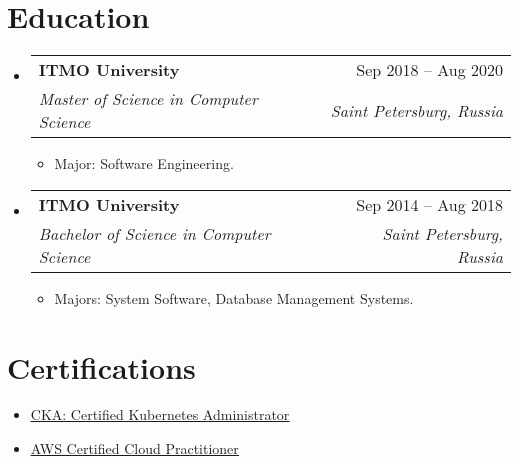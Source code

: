 \documentclass[a4paper,10pt]{article}
\makeatletter
\newcommand{\resumeItem}[1]{
  \item\small{#1}
}
\newcommand{\resumeItemListStart}{\begin{itemize}[rightmargin=0.11in]}
\newcommand{\resumeItemListEnd}{\end{itemize}}
\newcommand{\resumeTrioHeading}[3]{
  \item\small{
    \begin{tabular*}{0.96\textwidth}[t]{
      l@{\extracolsep{\fill}}c@{\extracolsep{\fill}}r
    }
      \textbf{#1} & \textit{#2} & #3
    \end{tabular*}
  }
}
\newcommand{\resumeQuadHeading}[4]{
  \item
  \begin{tabular*}{0.96\textwidth}[t]{l@{\extracolsep{\fill}}r}
    \textbf{#1} & #2 \\
    \textit{\small#3} & \textit{\small #4} \\
  \end{tabular*}
}
\newcommand{\resumeHeadingListStart}{
  \begin{itemize}[leftmargin=0.15in, label={}]
}
\newcommand{\resumeHeadingListEnd}{\end{itemize}}
\newcommand{\hrefUline}[2]{
  \href{#1}{\uline{#2}}
}
\makeatother
\begin{document}

\section{Education}
  \resumeHeadingListStart{}
    \resumeQuadHeading{ITMO University}{Sep 2018 -- Aug 2020}
    {Master of Science in Computer Science}{Saint Petersburg, Russia}
      \resumeItemListStart{}
        \resumeItem{Major: Software Engineering.}
      \resumeItemListEnd{}

    \resumeQuadHeading{ITMO University}{Sep 2014 -- Aug 2018}
    {Bachelor of Science in Computer Science}{Saint Petersburg, Russia}
      \resumeItemListStart{}
        \resumeItem{Majors: System Software, Database Management Systems.}
      \resumeItemListEnd{}
  \resumeHeadingListEnd{}







\section{Certifications}
  \resumeItemListStart{}
    \resumeItem{\hrefUline{https://www.credly.com/badges/24659e03-b038-41e8-9a85-9c10fbe525d5}{CKA: Certified Kubernetes Administrator}}
    \resumeItem{\hrefUline{https://www.credly.com/badges/968bad65-6464-49fb-b836-c53a0dd30daf}{AWS Certified Cloud Practitioner}}
  \resumeItemListEnd{}
\end{document}
